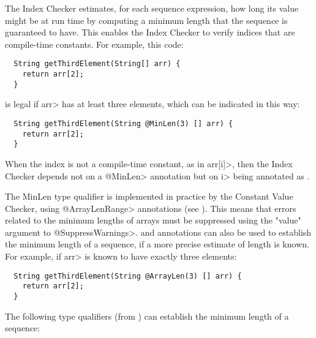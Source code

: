 
The Index Checker estimates, for each sequence expression, how long its value
might be at run time by computing a minimum length that
the sequence is guaranteed to have.  This enables the Index Checker to
verify indices that are compile-time constants.  For example, this code:

\begin{Verbatim}
  String getThirdElement(String[] arr) {
    return arr[2];
  }
\end{Verbatim}

\noindent
is legal if \<arr> has at least three elements, which can be indicated
in this way:

\begin{Verbatim}
  String getThirdElement(String @MinLen(3) [] arr) {
    return arr[2];
  }
\end{Verbatim}

When the index is not a compile-time constant, as in \<arr[i]>, then the
Index Checker depends not on a \<@MinLen> annotation but on \<i> being
annotated as
.

The MinLen type qualifier is implemented in practice by the Constant Value Checker,
using \<@ArrayLenRange> annotations (see ).
This means that errors related to the minimum lengths of arrays must be suppressed using
the "value" argument to \<@SuppressWarnings>.
 and 
annotations can also be used to establish the minimum length of a sequence, if a
more precise estimate of length is known. For example,
if \<arr> is known to have exactly three elements:

\begin{Verbatim}
  String getThirdElement(String @ArrayLen(3) [] arr) {
    return arr[2];
  }
\end{Verbatim}

The following type qualifiers (from )
can establish the minimum length of a sequence:


